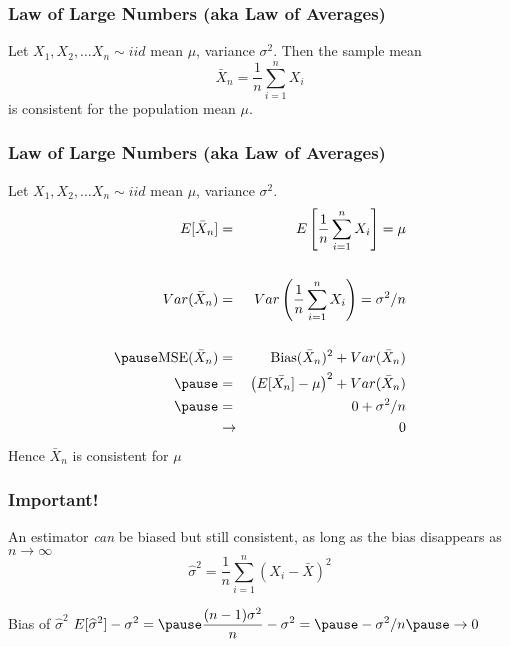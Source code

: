 \begin{frame}
\frametitle{Law of Large Numbers (aka Law of Averages)}
Let $X_1, X_2, \hdots X_n \sim iid$ mean $\mu$, variance $\sigma^2$. Then the sample mean 
	$$\bar{X}_n = \frac{1}{n}\sum_{i=1}^n X_i$$
is consistent for the population mean $\mu$.
\end{frame}




\begin{frame}
\frametitle{Law of Large Numbers (aka Law of Averages)}
Let $X_1, X_2, \hdots X_n \sim iid$ mean $\mu$, variance $\sigma^2$. 
	\begin{eqnarray*}
			E[\bar{X}_n] &=&  E \left[\frac{1}{n}\sum_{i=1}^n X_i\right] = \mu\\\\ 
      Var(\bar{X}_n) &=& Var\left(\frac{1}{n}\sum_{i=1}^n X_i  \right) = \sigma^2/n\\\\ \pause
			\mbox{MSE}(\bar{X}_n) &=& \mbox{Bias}(\bar{X}_n)^2 + Var(\bar{X}_n)\\\pause
				&=& \left(E[\bar{X_n}] - \mu\right)^2 + Var(\bar{X}_n)\\ \pause
				&=& 0 + \sigma^2/n\\ 
				&\rightarrow& 0
	\end{eqnarray*}
	\alert{Hence $\bar{X}_n$ is consistent for $\mu$}
\end{frame}

\begin{frame}
\frametitle{Important! }

An estimator \emph{can} be biased but still consistent, as long as the bias disappears as $n \rightarrow \infty$
$$\widehat{\sigma}^2 = \frac{1}{n}\sum_{i=1}^n \left(X_i - \bar{X}\right)^2$$


\begin{block}{Bias of $\widehat{\sigma}^2$}
\vspace{0.75em}
$\displaystyle E[\widehat{\sigma}^2 ] - \sigma^2 = \pause \frac{(n-1)\sigma^2}{n}  - \sigma^2 =  \pause -\sigma^2/n \pause \rightarrow 0$
\end{block}


\end{frame}




